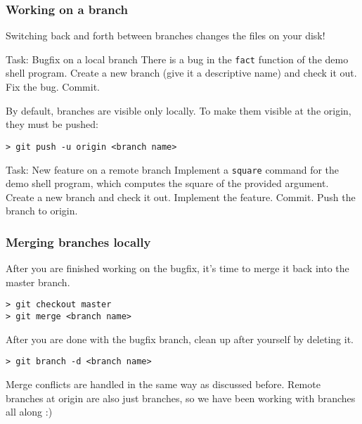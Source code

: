 \begin{frame}[fragile]

\frametitle{Working on a branch}
	
Switching back and forth between branches changes the files on your disk!

\begin{block}{Task: Bugfix on a local branch}
There is a bug in the \texttt{fact} function of the demo shell program. Create a new branch (give it a descriptive name) and check it out. Fix the bug. Commit.
\end{block}	

By default, branches are visible only locally. To make them visible at the origin, they must be pushed:
\begin{verbatim}
> git push -u origin <branch name>
\end{verbatim}

\begin{block}{Task: New feature on a remote branch}
Implement a \texttt{square} command for the demo shell program, which computes the square of the provided argument. Create a new branch and check it out. Implement the feature. Commit. Push the branch to origin.
\end{block}	

\end{frame}


\begin{frame}[fragile]

\frametitle{Merging branches locally}

After you are finished working on the bugfix, it's time to merge it back into the master branch.
\begin{verbatim}
> git checkout master
> git merge <branch name>
\end{verbatim}

After you are done with the bugfix branch, clean up after yourself by deleting it.
\begin{verbatim}
> git branch -d <branch name>
\end{verbatim}
	
Merge conflicts are handled in the same way as discussed before. Remote branches at origin are also just branches, so we have been working with branches all along :) 

\end{frame}

